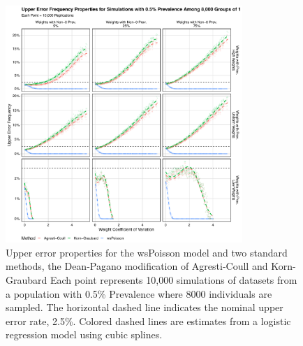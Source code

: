 \documentclass[AMA,STIX1COL]{WileyNJD-v2}
\begin{document}
\begin{figure}
\centering
\includegraphics[width=0.8\textwidth]{figures/perfect_upper_error_frequency_8000_groups_0_005_prev.pdf}
\caption{Upper error properties for the wsPoisson model and two standard methods, the Dean-Pagano modification of Agresti-Coull and Korn-Graubard
Each point represents 10,000 simulations of datasets from a population with 0.5\% Prevalence where 8000 individuals are sampled.
The horizontal dashed line indicates the nominal upper error rate, 2.5\%.
Colored dashed lines are estimates from a logistic regression model using cubic splines.}
\label{fig:perfect_upper_error_frequency_8000_groups_0_005_prev}
\end{figure}
\end{document}
